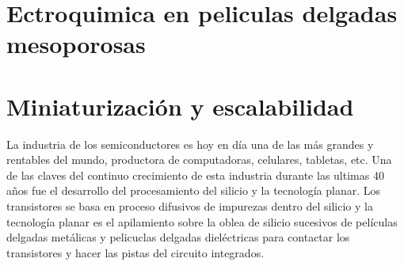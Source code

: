 
\section{Ectroquimica en peliculas delgadas mesoporosas}
	
\section{Miniaturización y escalabilidad}\label{sec:microfabricacion}\label{sec:intro_fotolito}
	



		La industria de los semiconductores es hoy en día una de las más grandes y rentables del mundo, productora de computadoras, celulares, tabletas, etc. Una de las claves del continuo crecimiento de esta industria durante las ultimas 40 años fue el desarrollo del procesamiento del silicio y la tecnología planar. Los transistores se basa en proceso difusivos de impurezas dentro del silicio y la tecnología planar es el apilamiento sobre la oblea de silicio sucesivos de películas delgadas metálicas y  pelicuclas delgadas dieléctricas para contactar los transistores y hacer las pistas del circuito integrados. 


